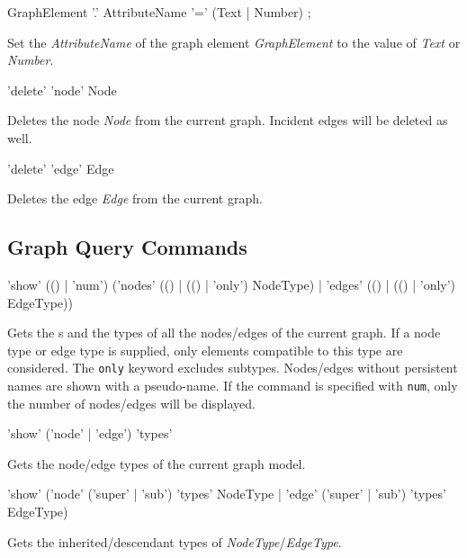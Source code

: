 \begin{rail}
  GraphElement '.' AttributeName '=' (Text | Number) ;
\end{rail}
Set the  \emph{AttributeName} of the graph element \emph{GraphElement} to the value of \emph{Text} or \emph{Number}.

\begin{rail}
  'delete' 'node' Node
\end{rail}
Deletes the node \emph{Node} from the current graph. Incident edges will be deleted as well.

\begin{rail}
  'delete' 'edge' Edge
\end{rail}
Deletes the edge \emph{Edge} from the current graph.
  
\subsection{Graph Query Commands}

\begin{rail}
  'show' (() | 'num') ('nodes' (() | (() | 'only') NodeType) | 'edges' (() | (() | 'only') EdgeType))
\end{rail}
Gets the s and the types of all the nodes/edges of the current graph. 
If a node type or edge type is supplied, only elements compatible to this type are considered. 
The \texttt{only} keyword excludes subtypes. Nodes/edges without persistent names are shown with a pseudo-name.
If the command is specified with \texttt{num}, only the number of nodes/edges will be displayed.

\begin{rail}
  'show' ('node' | 'edge') 'types'
\end{rail}
Gets the node/edge types of the current graph model.

\begin{rail}
'show' ('node' ('super' | 'sub') 'types' NodeType | 'edge' ('super' | 'sub') 'types' EdgeType)
\end{rail}
Gets the inherited/descendant types of \emph{NodeType}/\emph{EdgeType}.

